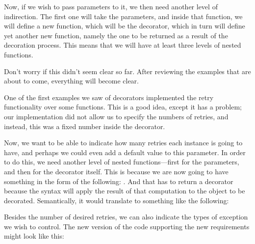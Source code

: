 \documentclass[a4paper,10pt,english]{sphinxmanual}
\begin{document}
Now, if we wish to pass parameters to it, we then need another level of indirection. The
first one will take the parameters, and inside that function, we will define a new function,
which will be the decorator, which in turn will define yet another new function, namely the
one to be returned as a result of the decoration process. This means that we will have at
least three levels of nested functions.

Don’t worry if this didn’t seem clear so far. After reviewing the examples that are about to
come, everything will become clear.

One of the first examples we saw of decorators implemented the retry functionality over
some functions. This is a good idea, except it has a problem; our implementation did not
allow us to specify the numbers of retries, and instead, this was a fixed number inside the
decorator.

Now, we want to be able to indicate how many retries each instance is going to have, and
perhaps we could even add a default value to this parameter. In order to do this, we need
another level of nested functions—first for the parameters, and then for the decorator itself.
This is because we are now going to have something in the form of the following:
. And that has to return a decorator because the  syntax will apply the result
of that computation to the object to be decorated. Semantically, it would translate to something
like the following: 

Besides the number of desired retries, we can also indicate the types of exception we wish
to control. The new version of the code supporting the new requirements might look like
this:
\end{document}
